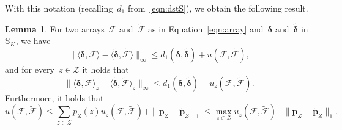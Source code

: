 \documentclass[11pt, a4paper]{article}
\theoremstyle{definition}
\newtheorem{lemma}[theorem]{Lemma}
\begin{document}
With this notation (recalling~$d_1$ from~\eqref{eqn:dstS}), we obtain the following result.
%
\begin{lemma}\label{lem:auxn1}
For two arrays~$\mathcal{F}$ and~$\tilde{\mathcal{F}}$ as in Equation~\eqref{eqn:array} and~$\bm{\delta}$ and~$\tilde{\bm{\delta}}$ in~$\mathbb{S}_K$, we have 
%
\begin{equation}\label{eqn:up1}
\| \langle \bm{\delta}, \mathcal{F} \rangle - \langle \tilde{\bm{\delta}}, \tilde{\mathcal{F}} \rangle \|_{\infty} \leq d_1(\bm{\delta}, \tilde{\bm{\delta}}) + u({\mathcal{F}}, \tilde{\mathcal{F}}),
\end{equation}	
and for every~$z \in \mathcal{Z}$ it holds that 
\begin{equation}\label{eqn:up2}
\| \langle \bm{\delta}, \mathcal{F} \rangle_z - \langle \tilde{\bm{\delta}}, \tilde{\mathcal{F}} \rangle_z \|_{\infty} \leq d_1(\bm{\delta}, \tilde{\bm{\delta}}) + u_z(\mathcal{F}, \tilde{\mathcal{F}}).
\end{equation}
Furthermore, it holds that
\begin{equation}\label{eqn:utouz}
u(\mathcal{F}, \tilde{\mathcal{F}}) \leq \sum_{z \in \mathcal{Z}} p_Z(z) u_z(\mathcal{F}, \tilde{\mathcal{F}}) + \|\bm{p}_Z - \tilde{\bm{p}}_Z\|_1 \leq \max_{z \in \mathcal{Z}} u_z(\mathcal{F}, \tilde{\mathcal{F}}) + \|\bm{p}_Z - \tilde{\bm{p}}_Z\|_1.
\end{equation}
\end{lemma}
\end{document}
